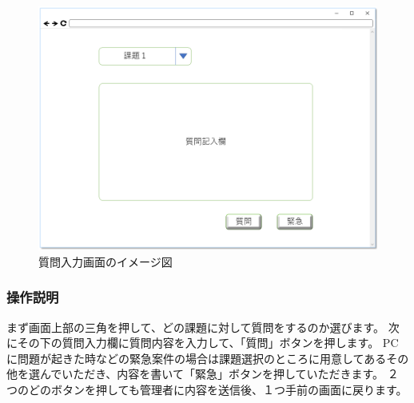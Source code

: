 \begin{figure}[htbp]
\begin{center}
  \includegraphics[width=1\linewidth,clip]{./img/sc_input_q.png}
  \caption{質問入力画面のイメージ図}\label{fig:sc_input_q}
\end{center}
\end{figure}

\subsubsection{操作説明}
まず画面上部の三角を押して、どの課題に対して質問をするのか選びます。
次にその下の質問入力欄に質問内容を入力して、「質問」ボタンを押します。
PCに問題が起きた時などの緊急案件の場合は課題選択のところに用意してあるその他を選んでいただき、内容を書いて「緊急」ボタンを押していただきます。
２つのどのボタンを押しても管理者に内容を送信後、１つ手前の画面に戻ります。

\newpage
